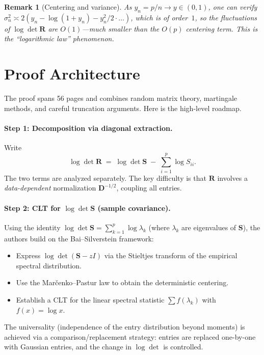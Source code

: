 \documentclass[11pt,a4paper]{article}
\newtheorem{remark}{Remark}
\begin{document}
\begin{remark}[Centering and variance]
As $y_n = p/n \to y \in (0,1)$, one can verify $\sigma_n^{2} \asymp 2(y_n - \log(1+y_n) - y_n^{2}/2\cdot\ldots)$, which is of order~$1$, so the fluctuations of $\log\det\mathbf{R}$ are $O(1)$---much smaller than the $O(p)$ centering term.  This is the ``logarithmic law'' phenomenon.
\end{remark}

\section{Proof Architecture}

The proof spans 56 pages and combines random matrix theory, martingale methods, and careful truncation arguments.  Here is the high-level roadmap.

\paragraph{Step 1: Decomposition via diagonal extraction.}
Write
\[
  \log\det\mathbf{R} \;=\; \log\det\mathbf{S} \;-\; \sum_{i=1}^{p}\log S_{ii}.
\]
The two terms are analyzed separately.  The key difficulty is that $\mathbf{R}$ involves a \emph{data-dependent} normalization $\mathbf{D}^{-1/2}$, coupling all entries.

\paragraph{Step 2: CLT for $\log\det\mathbf{S}$ (sample covariance).}
Using the identity $\log\det\mathbf{S} = \sum_{k=1}^{p}\log\lambda_k$ (where $\lambda_k$ are eigenvalues of $\mathbf{S}$), the authors build on the Bai--Silverstein framework:
\begin{itemize}[nosep]
  \item Express $\log\det(\mathbf{S}-zI)$ via the Stieltjes transform of the empirical spectral distribution.
  \item Use the Mar\v{c}enko--Pastur law to obtain the deterministic centering.
  \item Establish a CLT for the linear spectral statistic $\sum f(\lambda_k)$ with $f(x)=\log x$.
\end{itemize}
The universality (independence of the entry distribution beyond moments) is achieved via a comparison/replacement strategy: entries are replaced one-by-one with Gaussian entries, and the change in $\log\det$ is controlled.
\end{document}
